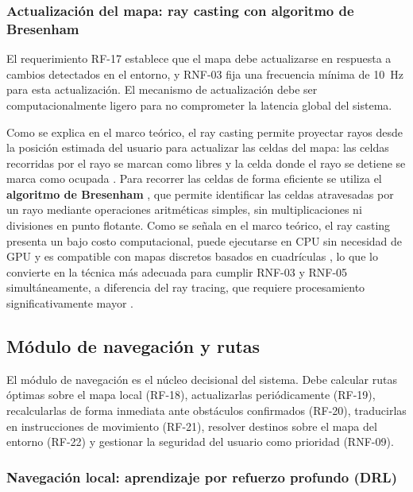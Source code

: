 \subsubsection{Actualización del mapa: ray casting con algoritmo de Bresenham}

El requerimiento RF-17 establece que el mapa debe actualizarse en respuesta a cambios
detectados en el entorno, y RNF-03 fija una frecuencia mínima de 10~Hz para esta
actualización. El mecanismo de actualización debe ser computacionalmente ligero para
no comprometer la latencia global del sistema.

Como se explica en el marco teórico, el ray casting permite proyectar rayos desde la
posición estimada del usuario para actualizar las celdas del mapa: las celdas recorridas
por el rayo se marcan como libres y la celda donde el rayo se detiene se marca como
ocupada \cite{elfes1989}. Para recorrer las celdas de forma eficiente se utiliza el
\textbf{algoritmo de Bresenham} \cite{bresenham1965}, que permite identificar las celdas
atravesadas por un rayo mediante operaciones aritméticas simples, sin multiplicaciones
ni divisiones en punto flotante. Como se señala en el marco teórico, el ray casting
presenta un bajo costo computacional, puede ejecutarse en CPU sin necesidad de GPU y es
compatible con mapas discretos basados en cuadrículas \cite{stackoverflow_raycasting},
lo que lo convierte en la técnica más adecuada para cumplir RNF-03 y RNF-05
simultáneamente, a diferencia del ray tracing, que requiere procesamiento
significativamente mayor \cite{stackoverflow_raycasting}.

\subsection{Módulo de navegación y rutas}

El módulo de navegación es el núcleo decisional del sistema. Debe calcular rutas
óptimas sobre el mapa local (RF-18), actualizarlas periódicamente (RF-19),
recalcularlas de forma inmediata ante obstáculos confirmados (RF-20), traducirlas
en instrucciones de movimiento (RF-21), resolver destinos sobre el mapa del entorno
(RF-22) y gestionar la seguridad del usuario como prioridad (RNF-09).

\subsubsection{Navegación local: aprendizaje por refuerzo profundo (DRL)}


